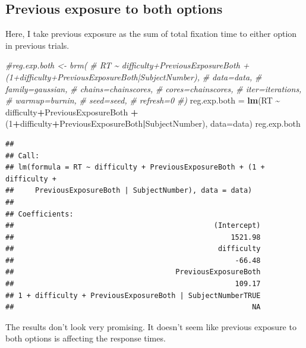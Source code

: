 \documentclass[
]{book}
\newenvironment{Shaded}{\begin{snugshade}}{\end{snugshade}}
\newcommand{\AttributeTok}[1]{\textcolor[rgb]{0.13,0.29,0.53}{#1}}
\newcommand{\CommentTok}[1]{\textcolor[rgb]{0.56,0.35,0.01}{\textit{#1}}}
\newcommand{\DecValTok}[1]{\textcolor[rgb]{0.00,0.00,0.81}{#1}}
\newcommand{\FunctionTok}[1]{\textcolor[rgb]{0.13,0.29,0.53}{\textbf{#1}}}
\newcommand{\NormalTok}[1]{#1}
\newcommand{\OtherTok}[1]{\textcolor[rgb]{0.56,0.35,0.01}{#1}}
\newcommand{\SpecialCharTok}[1]{\textcolor[rgb]{0.81,0.36,0.00}{\textbf{#1}}}
\begin{document}
\hypertarget{previous-exposure-to-both-options}{%
\subsection{Previous exposure to both options}\label{previous-exposure-to-both-options}}

Here, I take previous exposure as the sum of total fixation time to either option in previous trials.

\begin{Shaded}
\begin{Highlighting}[]
\CommentTok{\#reg.exp.both \textless{}{-} brm(}
\CommentTok{\#  RT \textasciitilde{} difficulty+PreviousExposureBoth + (1+difficulty+PreviousExposureBoth|SubjectNumber),}
\CommentTok{\#  data=data,}
\CommentTok{\#  family=gaussian,}
\CommentTok{\#  chains=chainscores,}
\CommentTok{\#  cores=chainscores,}
\CommentTok{\#  iter=iterations,}
\CommentTok{\#  warmup=burnin,}
\CommentTok{\#  seed=seed,}
\CommentTok{\#  refresh=0}
\CommentTok{\#)}
\NormalTok{reg.exp.both }\OtherTok{=} \FunctionTok{lm}\NormalTok{(RT }\SpecialCharTok{\textasciitilde{}}\NormalTok{ difficulty}\SpecialCharTok{+}\NormalTok{PreviousExposureBoth }\SpecialCharTok{+}\NormalTok{ (}\DecValTok{1}\SpecialCharTok{+}\NormalTok{difficulty}\SpecialCharTok{+}\NormalTok{PreviousExposureBoth}\SpecialCharTok{|}\NormalTok{SubjectNumber), }\AttributeTok{data=}\NormalTok{data)}
\NormalTok{reg.exp.both}
\end{Highlighting}
\end{Shaded}

\begin{verbatim}
## 
## Call:
## lm(formula = RT ~ difficulty + PreviousExposureBoth + (1 + difficulty + 
##     PreviousExposureBoth | SubjectNumber), data = data)
## 
## Coefficients:
##                                               (Intercept)  
##                                                   1521.98  
##                                                difficulty  
##                                                    -66.48  
##                                      PreviousExposureBoth  
##                                                    109.17  
## 1 + difficulty + PreviousExposureBoth | SubjectNumberTRUE  
##                                                        NA
\end{verbatim}

The results don't look very promising. It doesn't seem like previous exposure to both options is affecting the response times.
\end{document}
